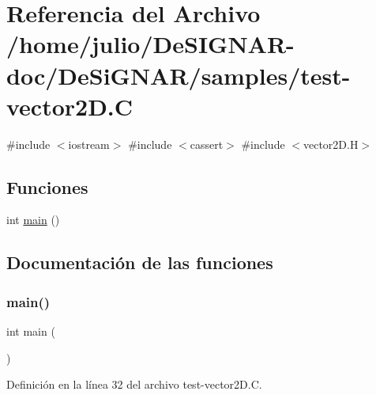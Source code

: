 \hypertarget{test-vector2_d_8_c}{}\section{Referencia del Archivo /home/julio/\+De\+S\+I\+G\+N\+A\+R-\/doc/\+De\+Si\+G\+N\+A\+R/samples/test-\/vector2D.C}
\label{test-vector2_d_8_c}
{\ttfamily \#include $<$iostream$>$}\newline
{\ttfamily \#include $<$cassert$>$}\newline
{\ttfamily \#include $<$vector2\+D.\+H$>$}\newline
\subsection*{Funciones}
\begin{DoxyCompactItemize}
\item 
int \hyperlink{test-vector2_d_8_c_ae66f6b31b5ad750f1fe042a706a4e3d4}{main} ()
\end{DoxyCompactItemize}


\subsection{Documentación de las funciones}
\mbox{\label{test-vector2_d_8_c_ae66f6b31b5ad750f1fe042a706a4e3d4}} 
\subsubsection{\texorpdfstring{main()}{main()}}
{\footnotesize\ttfamily int main (\begin{DoxyParamCaption}{ }\end{DoxyParamCaption})}



Definición en la línea 32 del archivo test-\/vector2\+D.\+C.

